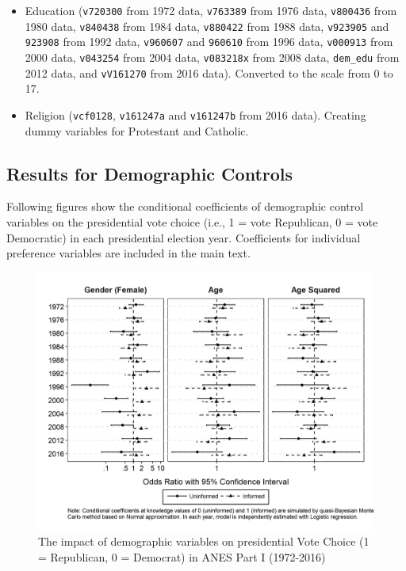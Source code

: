 \begin{itemize}
    \item Education (\texttt{v720300} from 1972 data, \texttt{v763389} from 1976 data, \texttt{v800436} from 1980 data, \texttt{v840438} from 1984 data, \texttt{v880422} from 1988 data, \texttt{v923905} and \texttt{923908} from 1992 data, \texttt{v960607} and \texttt{960610} from 1996 data, \texttt{v000913} from 2000 data, \texttt{v043254} from 2004 data, \texttt{v083218x} from 2008 data, \texttt{dem\_edu} from 2012 data, and \texttt{vV161270} from 2016 data). Converted to the scale from 0 to 17.
    \item Religion (\texttt{vcf0128}, \texttt{v161247a} and \texttt{v161247b} from 2016 data). Creating dummy variables for Protestant and Catholic.
\end{itemize}

\subsection{Results for Demographic Controls} 

\par Following figures show the conditional coefficients of demographic control variables on the presidential vote choice (i.e., 1 = vote Republican, 0 = vote Democratic) in each presidential election year. Coefficients for individual preference variables are included in the main text. 

\begin{figure}[ht!!!]
    \caption{The impact of demographic variables on presidential Vote Choice (1 = Republican, 0 = Democrat) in ANES Part I (1972-2016)}
    \label{fig:anescoefplot_dem1}
    \includegraphics[width=\linewidth]{../outputs/m1sq_anescoefplot_dem1.png}
\end{figure}

